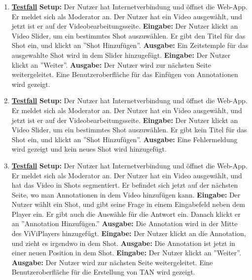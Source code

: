 \begin{enumerate}
	\item \underline{\textbf{Testfall}} \linebreak
	\textbf{Setup:} Der Nutzer hat Internetverbindung und öffnet die Web-App. Er meldet sich als Moderator an. Der Nutzer hat ein Video ausgewählt, und jetzt ist er auf der Videobearbeitungsseite.\linebreak
	\textbf{Eingabe:} Der Nutzer klickt an Video Slider, um ein bestimmtes Shot auszuwählen. Er gibt den Titel für das Shot ein, und klickt an ''Shot Hinzufügen''. \linebreak
	\textbf{Ausgabe:} Ein Zeitstemple für das ausgewahlte Shot wird in dem Slider hinzugefügt.\linebreak
	\textbf{Eingabe:} Der Nutzer klickt an ''Weiter''. \linebreak
	\textbf{Ausgabe:} Der Nutzer wird zur nächsten Seite weitergeleitet. Eine Benutzeroberfläche für das Einfügen von Annotationen wird gezeigt.
	
	\item \underline{\textbf{Testfall}} \linebreak
	\textbf{Setup:} Der Nutzer hat Internetverbindung und öffnet die Web-App. Er meldet sich als Moderator an. Der Nutzer hat ein Video ausgewählt, und jetzt ist er auf der Videobearbeitungsseite.\linebreak
	\textbf{Eingabe:} Der Nutzer klickt an Video Slider, um ein bestimmtes Shot auszuwählen. Er gibt kein Titel für das Shot ein, und klickt an ''Shot Hinzufügen''. \linebreak
	\textbf{Ausgabe:} Eine Fehlermeldung wird gezeigt und kein neues Shot wird hinzugefügt.
	
	\item \underline{\textbf{Testfall}} \linebreak
	\textbf{Setup:} Der Nutzer hat Internetverbindung und öffnet die Web-App. Er meldet sich als Moderator an. Der Nutzer hat ein Video ausgewählt, und hat das Video in Shots segmentiert. Er befindet sich jetzt auf der nächsten Seite, wo man Annotationen in dem Video hinzufügen kann.\linebreak
	\textbf{Eingabe:} Der Nutzer wählt ein Shot, und gibt seine Frage in einem Eingabefeld neben dem Player ein. Er gibt auch die Auswähle für die Antwort ein. Danach klickt er an ''Annotation Hinzufügen.''\linebreak
	\textbf{Ausgabe:} Die Annotation wird in der Mitte des ViViPlayers hinzugefügt.\linebreak
	\textbf{Eingabe:} Der Nutzer klickt an die Annotation, und zieht es irgendwo in dem Shot.\linebreak
	\textbf{Ausgabe:} Die Annotation ist jetzt in einer neuen Position in dem Shot.\linebreak
	\textbf{Eingabe:} Der Nutzer klickt an ''Weiter''. \linebreak
	\textbf{Ausgabe:} Der Nutzer wird zur nächsten Seite weitergeleitet. Eine Benutzeroberfläche für die Erstellung von TAN wird gezeigt.
	

\end{enumerate}
